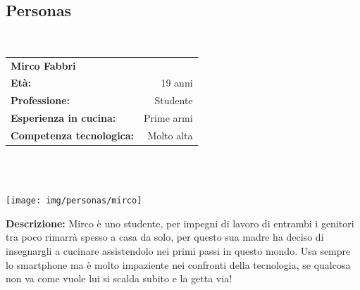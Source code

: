 \subsection{Personas}
\hrulefill\\
\begin{minipage}{.75\textwidth}
\begin{tabular}{l | r}
	\textbf{Mirco Fabbri} & \\
	\textbf{Età:} & 19 anni\\
	\textbf{Professione:} & Studente\\
	\textbf{Esperienza in cucina:} & Prime armi\\
	\textbf{Competenza tecnologica:} & Molto alta\\
\end{tabular}\\\\
\end{minipage}
\begin{minipage}{.24\textwidth}
	\texttt{[image: img/personas/mirco]}
\end{minipage}
	\textbf{Descrizione:}  Mirco è uno studente, per impegni di lavoro di
	entrambi i genitori tra poco rimarrà spesso a casa da solo, per questo
	sua madre ha deciso di insegnargli a cucinare assistendolo nei primi
	passi in questo mondo.  Usa sempre lo smartphone ma è molto impaziente
	nei confronti della tecnologia, se qualcosa non va come vuole lui si
	scalda subito e la getta via!\\

